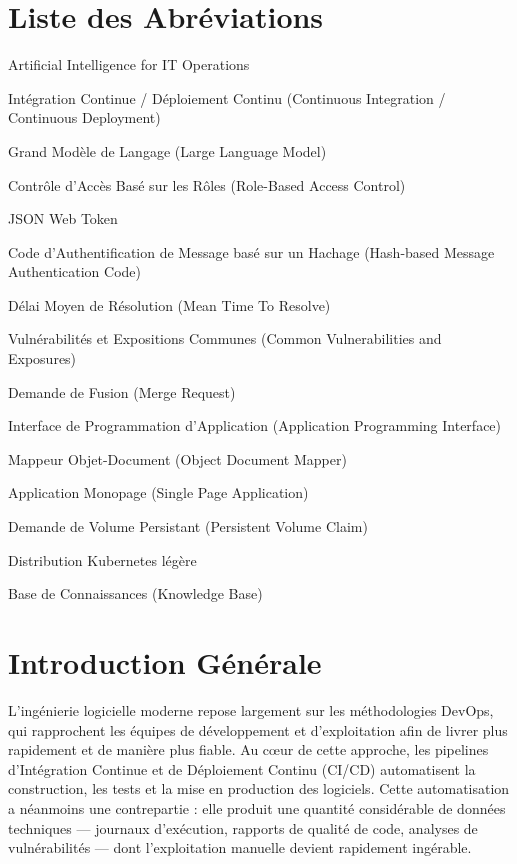 \documentclass[12pt,a4paper,oneside]{report}
\begin{document}
\chapter*{Liste des Abréviations}
\begin{description}[leftmargin=3.4cm,style=nextline,labelwidth=3.2cm,font=\bfseries\color{primary}]
  \item[AIOps] Artificial Intelligence for IT Operations
  \item[CI/CD] Intégration Continue / Déploiement Continu (Continuous Integration / Continuous Deployment)
  \item[LLM] Grand Modèle de Langage (Large Language Model)
  \item[RBAC] Contrôle d'Accès Basé sur les Rôles (Role-Based Access Control)
  \item[JWT] JSON Web Token
  \item[HMAC] Code d'Authentification de Message basé sur un Hachage (Hash-based Message Authentication Code)
  \item[MTTR] Délai Moyen de Résolution (Mean Time To Resolve)
  \item[CVE] Vulnérabilités et Expositions Communes (Common Vulnerabilities and Exposures)
  \item[MR] Demande de Fusion (Merge Request)
  \item[API] Interface de Programmation d'Application (Application Programming Interface)
  \item[ODM] Mappeur Objet-Document (Object Document Mapper)
  \item[SPA] Application Monopage (Single Page Application)
  \item[PVC] Demande de Volume Persistant (Persistent Volume Claim)
  \item[k3s] Distribution Kubernetes légère
  \item[KB] Base de Connaissances (Knowledge Base)
\end{description}

\cleardoublepage
{}

\chapter*{Introduction Générale}
L'ingénierie logicielle moderne repose largement sur les méthodologies DevOps, qui rapprochent les équipes de développement et d'exploitation afin de livrer plus rapidement et de manière plus fiable. Au cœur de cette approche, les pipelines d'Intégration Continue et de Déploiement Continu (CI/CD) automatisent la construction, les tests et la mise en production des logiciels. Cette automatisation a néanmoins une contrepartie : elle produit une quantité considérable de données techniques --- journaux d'exécution, rapports de qualité de code, analyses de vulnérabilités --- dont l'exploitation manuelle devient rapidement ingérable.
\end{document}
